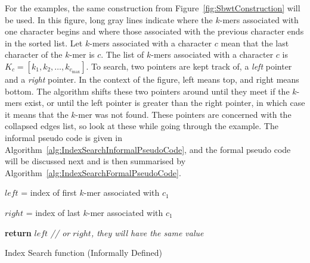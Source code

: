 For the examples, the same construction from Figure~\ref{fig:SbwtConstruction} will be used.
In this figure, long gray lines indicate where the $k$-mers associated with one character begins and where those associated with the previous character ends in the sorted list.
Let $k$-mers associated with a character $c$ mean that the last character of the $k$-mer is $c$.
The list of $k$-mers associated with a character $c$ is $K_c = [k_1, k_2, \ldots, k_{c_{\max}}]$.
To search, two pointers are kept track of, a \textit{left} pointer and a \textit{right} pointer.
In the context of the figure, left means top, and right means bottom.
The algorithm shifts these two pointers around until they meet if the $k$-mers exist, or until the left pointer is greater than the right pointer, in which case it means that the $k$-mer was not found.
These pointers are concerned with the collapsed edges list, so look at these while going through the example.
The informal pseudo code is given in Algorithm~\ref{alg:IndexSearchInformalPseudoCode}, and the formal pseudo code will be discussed next and is then summarised by Algorithm~\ref{alg:IndexSearchFormalPseudoCode}.

\begin{algorithm}
	$\mathit{left}$ = index of first $k$-mer associated with $c_1$

	$\mathit{right}$ = index of last $k$-mer associated with $c_1$

  \textbf{return} $\mathit{left}$ \textit{// or }$\mathit{right}$\textit{, they will have the same value}
	\caption{Index Search function (Informally Defined)}\label{alg:IndexSearchInformalPseudoCode}
\end{algorithm}

